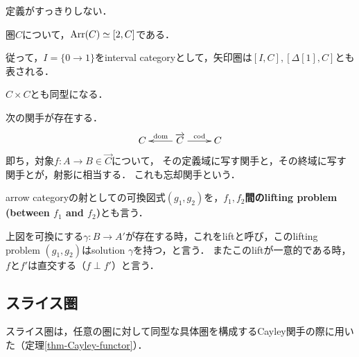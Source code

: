 \documentclass[uplatex, dvipdfmx]{jsreport}
\begin{document}
定義がすっきりしない．

\begin{proposition}[特徴付け]
    圏$C$について，$\mathrm{Arr}(C)\simeq [2,C]$である．
\end{proposition}
\begin{remark}
    従って，$I=\{0\to 1\}$をinterval categoryとして，矢印圏は$[I,C],[\Delta[1],C]$とも表される．
\end{remark}

$C\times C$とも同型になる．
\begin{remark}
    次の関手が存在する．
    \[\xymatrix{
        C&\overrightarrow{C}\ar[r]^-{\mathrm{cod}}\ar[l]_-{\mathrm{dom}}&C
    }\]
    即ち，対象$f:A\to B\in\overrightarrow{C}$について，
    その定義域に写す関手と，その終域に写す関手とが，射影に相当する．
    これも忘却関手という．
\end{remark}

\begin{remark}[lift]
    arrow categoryの射としての可換図式$(g_1,g_2)$を，\textbf{$f_1,f_2$間のlifting problem (between $f_1$ and $f_2$)}とも言う．
    \begin{center}\end{center}
    上図を可換にする$\gamma:B\to A'$が存在する時，これをliftと呼び，このlifting problem $(g_1,g_2)$はsolution $\gamma$を持つ，と言う．
    またこのliftが一意的である時，$f$と$f'$は直交する（$f\perp f'$）と言う．
\end{remark}

\subsection{スライス圏}
スライス圏は，任意の圏に対して同型な具体圏を構成するCayley関手の際に用いた（定理\ref{thm-Cayley-functor}）．
\end{document}
